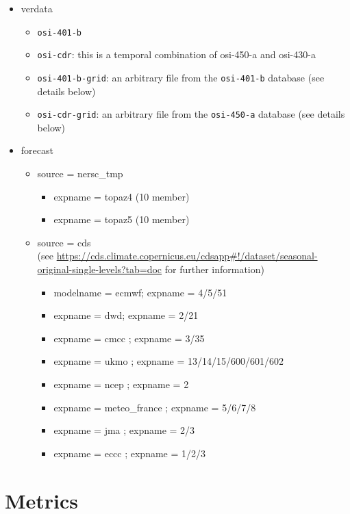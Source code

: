 \documentclass[DIV=10, parskip=full]{scrreprt}
\begin{document}
\begin{itemize}
	\item verdata
	\begin{itemize}
			\item \texttt{osi-401-b}
			\item \texttt{osi-cdr}: this is a temporal combination of osi-450-a and osi-430-a
			\item \texttt{osi-401-b-grid}: an arbitrary file from the \texttt{osi-401-b} database (see details below)
			\item \texttt{osi-cdr-grid}: an arbitrary file from the \texttt{osi-450-a} database (see details below)
	\end{itemize}
	
	\item forecast
	\begin{itemize}
		\item source = nersc\_tmp
		\begin{itemize}
			\item expname = topaz4 (10 member)
			\item expname = topaz5 (10 member)
		\end{itemize}
		\item source = cds \\
		(see \url{https://cds.climate.copernicus.eu/cdsapp#!/dataset/seasonal-original-single-levels?tab=doc} for further information)
		\begin{itemize}
			\item modelname = ecmwf; expname = 4/5/51
			\item expname = dwd; expname = 2/21
			\item expname = cmcc ; expname = 3/35
			\item expname = ukmo ; expname = 13/14/15/600/601/602
			\item expname = ncep ; expname = 2
			\item expname = meteo\_france ; expname = 5/6/7/8
			\item expname = jma ; expname = 2/3
			\item expname = eccc ; expname = 1/2/3
		\end{itemize}
	\end{itemize}
\end{itemize}



\chapter{Metrics}\label{chap:metrics}
\end{document}
